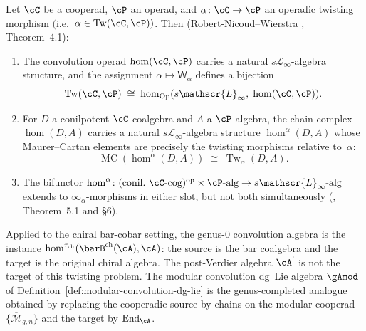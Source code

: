 \begin{theorem}
\label{thm:operadic-homotopy-convolution}%
%
%
Let $\cC$ be a cooperad, $\cP$ an operad, and
$\alpha\colon \cC \to \cP$ an operadic twisting morphism
$($i.e.\ $\alpha \in \operatorname{Tw}(\cC,\cP))$.
Then \textup{(Robert-Nicoud--Wierstra \cite{RNW19}, Theorem~4.1)}:
\begin{enumerate}[label=\textup{(\roman*)}]
\item The convolution operad
 $\operatorname{hom}(\cC,\cP)$ carries a natural
 $s\mathscr{L}_\infty$-algebra structure, and the assignment
 $\alpha \mapsto \mathsf{W}_\alpha$ defines a bijection
 \begin{equation}\label{eq:rnw-bijection}
 \operatorname{Tw}(\cC,\cP)
 \;\cong\;
 \operatorname{hom}_{\mathrm{Op}}(s\mathscr{L}_\infty,\;
 \operatorname{hom}(\cC,\cP)).
 \end{equation}
\item For $D$ a conilpotent $\cC$-coalgebra and $A$ a $\cP$-algebra,
 the chain complex $\operatorname{hom}(D, A)$ carries a natural
 $s\mathscr{L}_\infty$-algebra structure
 $\operatorname{hom}^\alpha(D,A)$ whose Maurer--Cartan elements
 are precisely the twisting morphisms relative to~$\alpha$:
 \begin{equation}\label{eq:rnw-mc-tw}
 \operatorname{MC}(\operatorname{hom}^\alpha(D,A))
 \;\cong\;
 \operatorname{Tw}_\alpha(D,A).
 \end{equation}
\item The bifunctor
 $\operatorname{hom}^\alpha\colon
 (\text{conil.\ }\cC\text{-cog})^{\mathrm{op}} \times
 \cP\text{-alg} \to s\mathscr{L}_\infty\text{-alg}$
 extends to $\infty_\alpha$-morphisms in either slot, but not
 both simultaneously \textup{(\cite{RNW19}, Theorem~5.1 and \S6)}.
\end{enumerate}
Applied to the chiral bar-cobar setting, the genus-$0$
convolution algebra is the instance
$\operatorname{hom}^{\tau_{\mathrm{ch}}}
(\barB^{\mathrm{ch}}(\cA),\cA)$: the source is the bar
coalgebra and the target is the original chiral algebra. The
post-Verdier algebra $\cA^!$ is not the target of this twisting
problem. The modular convolution dg~Lie algebra $\gAmod$ of
Definition~\textup{\ref{def:modular-convolution-dg-lie}} is the
genus-completed analogue obtained by replacing the cooperadic
source by chains on the modular cooperad
$\{\overline{\mathcal M}_{g,n}\}$ and the target by
$\operatorname{End}_{\cA}$.
\end{theorem}

